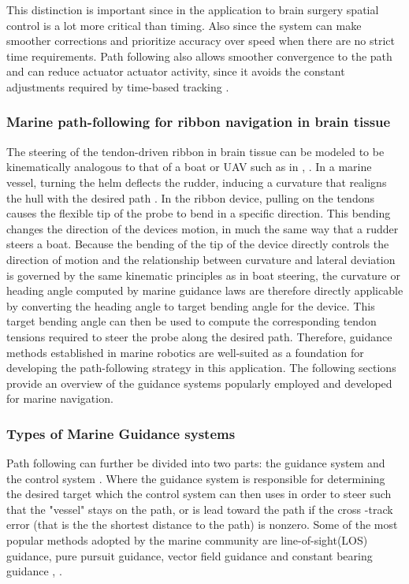 This distinction is important since in the application to brain surgery spatial control is a lot more critical than timing. Also since the system can make smoother corrections and prioritize accuracy over speed when there are no strict time requirements. Path following also allows smoother convergence to the path and can reduce actuator actuator activity, since it avoids the constant adjustments required by time-based tracking \cite{aguiar_trajectory-tracking_2007}.

\subsubsection{Marine path-following for ribbon navigation in brain tissue}
The steering of the tendon-driven ribbon in brain tissue can be modeled to be kinematically analogous to that of a boat or UAV such as in \cite{secoli_adaptive_2016}, \cite{secoli_closed-loop_2013} \cite{ko_closed-loop_2011}. In a marine vessel, turning the helm deflects the rudder, inducing a curvature that realigns the hull with the desired path \cite{borhaug_integral_2008}. In the ribbon device, pulling on the tendons causes the flexible tip of the probe to bend in a specific direction. This bending changes the direction of the devices motion, in much the same way that a rudder steers a boat. 
\newline \newline 
Because the bending of the tip of the device directly controls the direction of motion and the relationship between curvature and lateral deviation is governed by the same kinematic principles as in boat steering, the curvature or heading angle computed by marine guidance laws are therefore directly applicable by converting the heading angle to target bending angle for the device. This target bending angle can then be used to compute the corresponding tendon tensions required to steer the probe along the desired path.
\newline \newline 
Therefore, guidance methods established in marine robotics are well-suited as a foundation for developing the path-following strategy in this application. The following sections  provide an overview of the guidance systems popularly employed and developed for marine navigation.

\subsubsection{Types of Marine Guidance systems}
Path following can further be divided into two parts: the guidance system and the control system \cite{qi_curve_2022}. Where the guidance system is responsible for determining the desired target which the control system can then uses in order to steer such that the "vessel" stays on the path, or is lead toward the path if the cross -track error (that is the the shortest distance to the path) is nonzero. Some of the most popular methods adopted by the marine community are line-of-sight(LOS) guidance, pure pursuit guidance, vector field guidance and constant bearing guidance \cite{qi_curve_2022}, \cite{lekkas_integral_2014}. 

